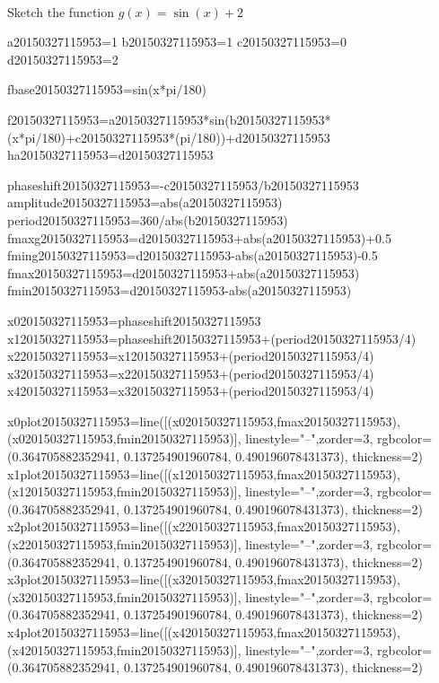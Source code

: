 \begin{example}[id:20150327-115953] \label{20150327-115953} \hfill \\
Sketch the function $g(x)=\sin(x)+2$

\soln

\begin{sagesilent}
a20150327115953=1
b20150327115953=1
c20150327115953=0
d20150327115953=2

fbase20150327115953=sin(x*pi/180)

f20150327115953=a20150327115953*sin(b20150327115953*(x*pi/180)+c20150327115953*(pi/180))+d20150327115953
ha20150327115953=d20150327115953

phaseshift20150327115953=-c20150327115953/b20150327115953
amplitude20150327115953=abs(a20150327115953)
period20150327115953=360/abs(b20150327115953)
fmaxg20150327115953=d20150327115953+abs(a20150327115953)+0.5
fming20150327115953=d20150327115953-abs(a20150327115953)-0.5
fmax20150327115953=d20150327115953+abs(a20150327115953)
fmin20150327115953=d20150327115953-abs(a20150327115953)

x020150327115953=phaseshift20150327115953
x120150327115953=phaseshift20150327115953+(period20150327115953/4)
x220150327115953=x120150327115953+(period20150327115953/4)
x320150327115953=x220150327115953+(period20150327115953/4)
x420150327115953=x320150327115953+(period20150327115953/4)

x0plot20150327115953=line([(x020150327115953,fmax20150327115953),(x020150327115953,fmin20150327115953)], linestyle="--",zorder=3, rgbcolor=(0.364705882352941, 0.137254901960784, 0.490196078431373), thickness=2)
x1plot20150327115953=line([(x120150327115953,fmax20150327115953),(x120150327115953,fmin20150327115953)], linestyle="--",zorder=3, rgbcolor=(0.364705882352941, 0.137254901960784, 0.490196078431373), thickness=2)
x2plot20150327115953=line([(x220150327115953,fmax20150327115953),(x220150327115953,fmin20150327115953)], linestyle="--",zorder=3, rgbcolor=(0.364705882352941, 0.137254901960784, 0.490196078431373), thickness=2)
x3plot20150327115953=line([(x320150327115953,fmax20150327115953),(x320150327115953,fmin20150327115953)], linestyle="--",zorder=3, rgbcolor=(0.364705882352941, 0.137254901960784, 0.490196078431373), thickness=2)
x4plot20150327115953=line([(x420150327115953,fmax20150327115953),(x420150327115953,fmin20150327115953)], linestyle="--",zorder=3, rgbcolor=(0.364705882352941, 0.137254901960784, 0.490196078431373), thickness=2)


\end{sagesilent}
\end{example}
